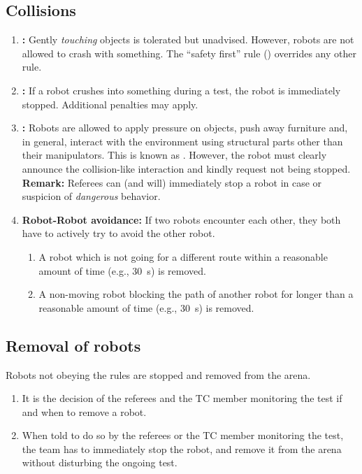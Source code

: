 \subsection{Collisions}
\begin{enumerate}
	\item \textbf{:} Gently \emph{touching} objects is tolerated but unadvised.
	However, robots are not allowed to crash with something.
	The \enquote{safety first} rule () overrides any other rule.

	\item \textbf{:} If a robot crushes into something during a test, the robot is immediately stopped.	Additional penalties may apply.

	\item \textbf{:} Robots are allowed to apply pressure on objects, push away furniture and, in general, interact with the environment using structural parts other than their manipulators.
	This is known as .
	However, the robot must clearly announce the collision-like interaction and kindly request not being stopped.\\
	\textbf{Remark: } Referees can (and will) immediately stop a robot in case or suspicion of \emph{dangerous} behavior.

	\item \textbf{Robot-Robot avoidance:} If two robots encounter each other, they both have to actively try to avoid the other robot.
	\begin{enumerate}
		\item A robot which is not going for a different route within a reasonable amount of time (e.g., \SI{30}{\second}) is removed.
		\item A non-moving robot blocking the path of another robot for longer than a reasonable amount of time (e.g., \SI{30}{\second}) is removed.
	\end{enumerate}
\end{enumerate}



\subsection{Removal of robots}
\label{rule:robot_removal}
Robots not obeying the rules are stopped and removed from the arena.
\begin{enumerate}
	\item It is the decision of the referees and the TC member monitoring the test if and when to remove a robot.
	\item When told to do so by the referees or the TC member monitoring the test, the team has to immediately stop the robot, and remove it from the arena without disturbing the ongoing test.
\end{enumerate}


